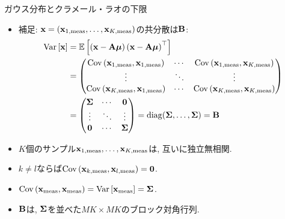 \documentclass[dvipdfmx,notheorems,t]{beamer}
\begin{document}
\begin{frame}{ガウス分布とクラメール・ラオの下限}
\begin{itemize}
  \item 補足: $\vb{x} = \left( \vb{x}_{1, \mathrm{meas}}, \ldots, \vb{x}_{K, \mathrm{meas}} \right)$の共分散は$\vb{B}$:
  {\small \begin{align*}
    \Var{\vb{x}}
      &= \E{\left( \vb{x} - \vb{A} \vb*{\mu} \right) \left( \vb{x} - \vb{A} \vb*{\mu} \right)^\top} \\
      &= \mqty(\Cov{\vb{x}_{1, \mathrm{meas}}}{\vb{x}_{1, \mathrm{meas}}} & \cdots &
        \Cov{\vb{x}_{1, \mathrm{meas}}}{\vb{x}_{K, \mathrm{meas}}} \\
        \vdots & \ddots & \vdots \\
        \Cov{\vb{x}_{K, \mathrm{meas}}}{\vb{x}_{1, \mathrm{meas}}} & \cdots &
        \Cov{\vb{x}_{K, \mathrm{meas}}}{\vb{x}_{K, \mathrm{meas}}}) \\
      &= \mqty(\vb{\Sigma} & \cdots & \vb{0} \\
        \vdots & \ddots & \vdots \\
        \vb{0} & \cdots & \vb{\Sigma})
      = \diag(\vb{\Sigma}, \ldots, \vb{\Sigma}) = \vb{B}
  \end{align*}}

  \item $K$個のサンプル$\vb{x}_{1, \mathrm{meas}}, \ldots, \vb{x}_{K, \mathrm{meas}}$は, 互いに独立無相関.
  \item $k \neq l$ならば$\operatorname{Cov} \left( \vb{x}_{k, \mathrm{meas}}, \vb{x}_{l, \mathrm{meas}} \right) = \vb{0}$.
  \item $\operatorname{Cov} \left( \vb{x}_\mathrm{meas}, \vb{x}_\mathrm{meas} \right) = \operatorname{Var} \left[ \vb{x}_\mathrm{meas} \right] = \vb{\Sigma}$.
  \item $\vb{B}$は, $\vb{\Sigma}$を並べた$MK \times MK$のブロック対角行列.
\end{itemize}
\end{frame}
\end{document}
